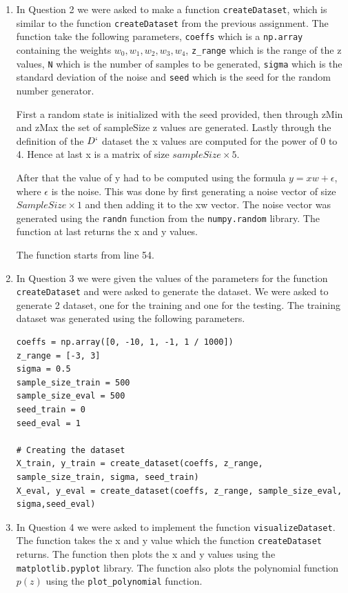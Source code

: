 \documentclass[a4paper]{article}
\begin{document}
\begin{enumerate}
	\item In Question 2 we were asked to make a function \texttt{createDataset}, which is similar to the function \texttt{createDataset} from the previous assignment. The function take the following parameters, \texttt{coeffs} which is a \texttt{np.array} containing the weights $ w_{0}, w_{1}, w_{2}, w_{3}, w_{4} $, \texttt{z\_range} which is the range of the z values, \texttt{N} which is the number of samples to be generated, \texttt{sigma} which is the standard deviation of the noise and \texttt{seed} which is the seed for the random number generator.

	      First a random state is initialized with the seed provided, then through zMin and zMax the set of sampleSize z values are generated. Lastly through the definition of the $ D` $ dataset the x values are computed for the power of 0 to 4. Hence at last x is a matrix of size $ sampleSize \times 5 $.

	      After that the value of y had to be computed using the formula $ y = xw + \epsilon $, where $ \epsilon $ is the noise. This was done by first generating a noise vector of size $ SampleSize \times 1 $ and then adding it to the xw vector. The noise vector was generated using the \texttt{randn} function from the \texttt{numpy.random} library. The function at last returns the x and y values.

	      The function starts from line 54.

	\item In Question 3 we were given the values of the parameters for the function \texttt{createDataset} and were asked to generate the dataset. We were asked to generate 2 dataset, one for the training and one for the testing. The training dataset was generated using the following parameters.

	      \begin{lstlisting}[style=mystyle]
coeffs = np.array([0, -10, 1, -1, 1 / 1000])
z_range = [-3, 3]
sigma = 0.5
sample_size_train = 500
sample_size_eval = 500
seed_train = 0
seed_eval = 1

# Creating the dataset
X_train, y_train = create_dataset(coeffs, z_range, sample_size_train, sigma, seed_train)
X_eval, y_eval = create_dataset(coeffs, z_range, sample_size_eval, sigma,seed_eval)

\end{lstlisting}



	\item In Question 4 we were asked to implement the function \texttt{visualizeDataset}. The function takes the x and y value which the function \texttt{createDataset} returns. The function then plots the x and y values using the \texttt{matplotlib.pyplot} library. The function also plots the polynomial function $ p(z) $ using the \texttt{plot\_polynomial} function.


\end{enumerate}
\end{document}
